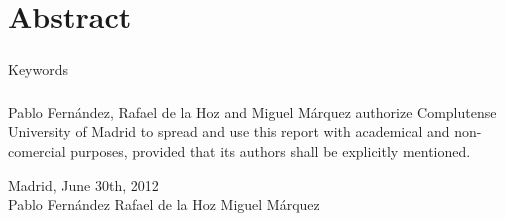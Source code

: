 \chapter*{Abstract}
\label{cha:abstract}
	
	
\newpage 
	\paragraph{}
	{\huge Keywords}
	\paragraph{}


\newpage %
	\paragraph{}
	Pablo Fernández, Rafael de la Hoz and Miguel Márquez authorize Complutense University 
	of Madrid to spread and use this report with academical and non-comercial purposes,
	provided that its authors shall be explicitly mentioned.
	\begin{center}
    	Madrid, June 30th, 2012\\
	    \vspace{5.5in}
		Pablo Fernández\hspace{0.75in}
		Rafael de la Hoz\hspace{0.75in}
		Miguel Márquez
	\end{center}
